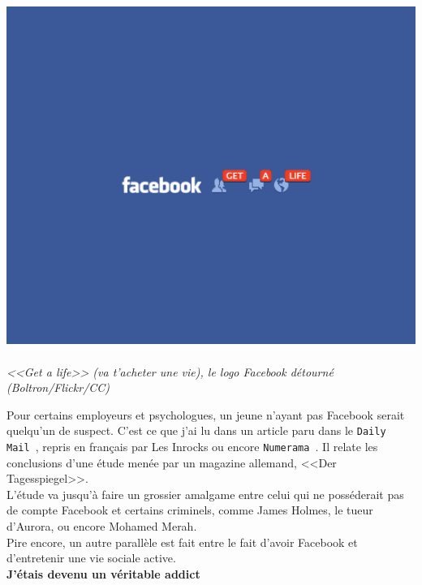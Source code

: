 \documentclass[11pt,twoside,a4paper]{article}
\begin{document}
\begin{minipage}[h]{0.42\textwidth}
	\begin{center}
		\includegraphics[width=1.00\textwidth]{img/1211-facebook-get-a-life_0.png}~\\
		\emph{<<Get a life>> (va t'acheter une vie), le logo Facebook d{\'e}tourn{\'e} (Boltron/Flickr/CC)~\footnotemark}
	\end{center}
\end{minipage} \hfill \begin{minipage}[h]{0.55\textwidth}
	Pour certains employeurs et psychologues, un jeune n'ayant pas Facebook serait quelqu'un de suspect. C'est ce que j'ai lu dans un article paru dans le \texttt{Daily Mail~\footnotemark}, repris en fran\c{c}ais par Les Inrocks ou encore \texttt{Numerama~\footnotemark}. Il relate les conclusions d'une {\'e}tude men{\'e}e par un magazine allemand, <<Der Tagesspiegel>>. ~\\
	
	L'{\'e}tude va jusqu'{\`a} faire un grossier amalgame entre celui qui ne poss{\'e}derait pas de compte Facebook et certains criminels, comme James Holmes, le tueur d'Aurora, ou encore Mohamed Merah. ~\\

	Pire encore, un autre parall{\`e}le est fait entre le fait d'avoir Facebook et d'entretenir une vie sociale active. ~\\
	
	\textbf{J'{\'e}tais devenu un v{\'e}ritable addict}~\\
\end{minipage}~\\~\\
\end{document}
